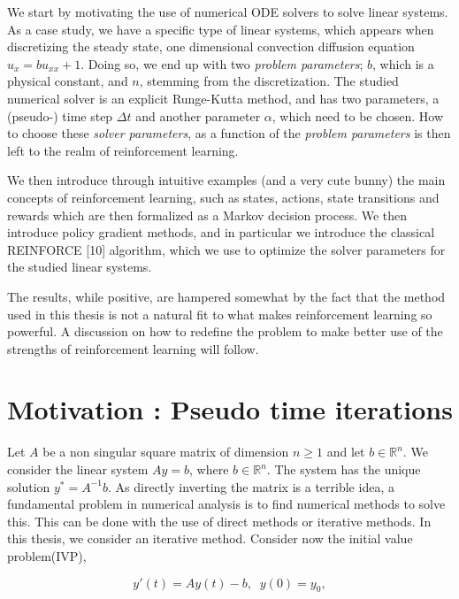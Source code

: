 \documentclass[
  letterpaper,
]{report}
\theoremstyle{plain}
\theoremstyle{definition}
\theoremstyle{definition}
\theoremstyle{remark}
\begin{document}
We start by motivating the use of numerical ODE solvers to solve linear
systems. As a case study, we have a specific type of linear systems,
which appears when discretizing the steady state, one dimensional
convection diffusion equation \(u_{x} = bu_{xx} +1\). Doing so, we end
up with two \emph{problem parameters}; \(b\), which is a physical
constant, and \(n\), stemming from the discretization. The studied
numerical solver is an explicit Runge-Kutta method, and has two
parameters, a (pseudo-) time step \(\Delta t\) and another parameter
\(\alpha\), which need to be chosen. How to choose these \emph{solver
parameters}, as a function of the \emph{problem parameters} is then left
to the realm of reinforcement learning.

We then introduce through intuitive examples (and a very cute bunny) the
main concepts of reinforcement learning, such as states, actions, state
transitions and rewards which are then formalized as a Markov decision
process. We then introduce policy gradient methods, and in particular we
introduce the classical REINFORCE {[}10{]} algorithm, which we use to
optimize the solver parameters for the studied linear systems.

The results, while positive, are hampered somewhat by the fact that the
method used in this thesis is not a natural fit to what makes
reinforcement learning so powerful. A discussion on how to redefine the
problem to make better use of the strengths of reinforcement learning
will follow.


\hypertarget{motivation-pseudo-time-iterations}{%
\chapter{Motivation : Pseudo time
iterations}\label{motivation-pseudo-time-iterations}}

Let \(A\) be a non singular square matrix of dimension \(n\geq 1\) and
let \(b\in\mathbb{R}^n\). We consider the linear system \(Ay = b\),
where \(b \in \mathbb{R}^n\). The system has the unique solution
\(y^* = A^{-1}b\). As directly inverting the matrix is a terrible idea,
a fundamental problem in numerical analysis is to find numerical methods
to solve this. This can be done with the use of direct methods or
iterative methods. In this thesis, we consider an iterative method.
Consider now the initial value problem(IVP),

\[
y'(t) = Ay(t)- b, \; \;  y(0) = y_0,
\]
\end{document}
